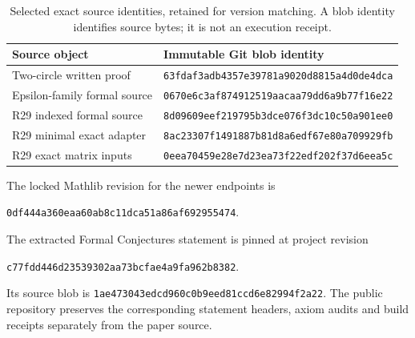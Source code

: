 \documentclass[11pt]{article}
\numberwithin{equation}{section}
\theoremstyle{definition}\newtheorem{definition}[theorem]{Definition}
\theoremstyle{remark}\newtheorem{remark}[theorem]{Remark}
\begin{document}
\begin{table}[ht]
\centering\footnotesize
\begin{tabularx}{\textwidth}{@{}p{}X@{}}
\toprule
Source object & Immutable Git blob identity\\\midrule
Two-circle written proof & \texttt{63fdaf3adb4357e39781a9020d8815a4d0de4dca}\\[3pt]
Epsilon-family formal source & \texttt{0670e6c3af874912519aacaa79dd6a9b77f16e22}\\[3pt]
R29 indexed formal source & \texttt{8d09609eef219795b3dce076f3dc10c50a901ee0}\\[3pt]
R29 minimal exact adapter & \texttt{8ac23307f1491887b81d8a6edf67e80a709929fb}\\[3pt]
R29 exact matrix inputs & \texttt{0eea70459e28e7d23ea73f22edf202f37d6eea5c}\\
\bottomrule
\end{tabularx}
\caption{Selected exact source identities, retained for version matching.
A blob identity identifies source bytes; it is not an execution receipt.}
\end{table}

The locked Mathlib revision for the newer endpoints is
\begin{center}\small\texttt{0df444a360eaa60ab8c11dca51a86af692955474}.\end{center}
The extracted Formal Conjectures statement is pinned at project revision
\begin{center}\small\texttt{c77fdd446d23539302aa73bcfae4a9fa962b8382}.\end{center}
Its source blob is \texttt{1ae473043edcd960c0b9eed81ccd6e82994f2a22}.
The public repository preserves the corresponding statement headers,
axiom audits and build receipts separately from the paper source.
\end{document}
